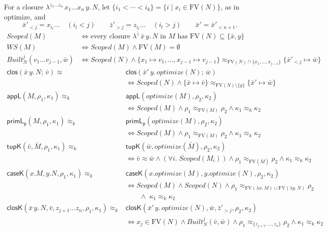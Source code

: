 \documentclass[10pt]{article}
\theoremstyle{acmplain}
\newcommand{\key}[1]{\mathsf{#1}}
\newcommand{\pass}[1]{\mathit{#1}}
\newcommand{\lam}[1]{\lambda #1.\,}
\newcommand{\clos}[2]{\lambda^{#1}\, #2.\,}
\newcommand{\FV}{\mathrm{FV}}
\newcommand{\closV}[2]{\key{clos}(#1;\, #2)}
\newcommand{\Kf}[2]{\key{#1}(#2)}
\newcommand{\approxk}{\approx_k}
\begin{document}
For a closure $\clos{z_1 \ldots z_n}{x_1 \ldots x_n\, y} N$, let
$\{ i_1 < \cdots < i_k \} = \{ i \mid x_i \in \FV(N) \}$, as in optimize, and
\[
  \bar{x}'_{<j} = x_{i_l} \ldots \quad (i_l < j) \qquad
  \bar{z}'_{>j} = z_{i_l} \ldots \quad (i_l > j) \qquad
  \bar{x}' = \bar{x}'_{<n+1} .
\]
\begin{align*}
  \mathit{Scoped}(M) &\iff \text{every closure } \clos{\bar{z}}{\bar{x}\, y} N \text{ in } M
    \text{ has } \FV(N) \subseteq \{\bar{x}, y\} \\
  \mathit{WS}(M) &\iff \mathit{Scoped}(M) \land \FV(M) = \emptyset \\
  \mathit{Built}^j_N(v_1 \ldots v_{j-1}, \bar{w}) &\iff \mathit{Scoped}(N) \land
    \{x_1 {\mapsto} v_1, \ldots, x_{j-1} {\mapsto} v_{j-1}\}
    \approx_{\FV(N) \cap \{x_1, \ldots, x_{j-1}\}} \{\bar{x}'_{<j} {\mapsto} \bar{w}\}
\end{align*}
\begin{align*}
  \closV{\bar{x}\, y.\, N}{\bar{v}} \approx {}& \closV{\bar{x}'\, y.\, \pass{optimize}(N)}{\bar{w}} \\
    &\iff \mathit{Scoped}(N) \land
      \{\bar{x} {\mapsto} \bar{v}\} \approx_{\FV(N) \setminus \{y\}} \{\bar{x}' {\mapsto} \bar{w}\} \\[1ex]
  \Kf{appL}{M, \rho_1, \kappa_1} \approxk {}& \Kf{appL}{\pass{optimize}(M), \rho_2, \kappa_2} \\
    &\iff \mathit{Scoped}(M) \land \rho_1 \approx_{\FV(M)} \rho_2 \land \kappa_1 \approxk \kappa_2 \\
  \Kf{primL_p}{M, \rho_1, \kappa_1} \approxk {}& \Kf{primL_p}{\pass{optimize}(M), \rho_2, \kappa_2} \\
    &\iff \mathit{Scoped}(M) \land \rho_1 \approx_{\FV(M)} \rho_2 \land \kappa_1 \approxk \kappa_2 \\
  \Kf{tupK}{\bar{v}, \bar{M}, \rho_1, \kappa_1} \approxk {}&
    \Kf{tupK}{\bar{w}, \pass{optimize}(\bar{M}), \rho_2, \kappa_2} \\
    &\iff \bar{v} \approx \bar{w} \land (\forall i.\; \mathit{Scoped}(M_i)) \land
      \rho_1 \approx_{\FV(\bar{M})} \rho_2 \land \kappa_1 \approxk \kappa_2 \\
  \Kf{caseK}{x.M, y.N, \rho_1, \kappa_1} \approxk {}&
    \Kf{caseK}{x.\pass{optimize}(M), y.\pass{optimize}(N), \rho_2, \kappa_2} \\
    &\iff \mathit{Scoped}(M) \land \mathit{Scoped}(N) \land
      \rho_1 \approx_{\FV(\lam{x} M) \cup \FV(\lam{y} N)} \rho_2 \\
    &\qquad \land\; \kappa_1 \approxk \kappa_2 \\
  \Kf{closK}{\bar{x}\, y.\, N, \bar{v}, z_{j+1} \ldots z_n, \rho_1, \kappa_1} \approxk {}&
    \Kf{closK}{\bar{x}'\, y.\, \pass{optimize}(N), \bar{w}, \bar{z}'_{>j}, \rho_2, \kappa_2} \\
    &\iff x_j \in \FV(N) \land \mathit{Built}^j_N(\bar{v}, \bar{w}) \land
      \rho_1 \approx_{\{z_{j+1}, \ldots, z_n\}} \rho_2 \land \kappa_1 \approxk \kappa_2
\end{align*}
\end{document}
